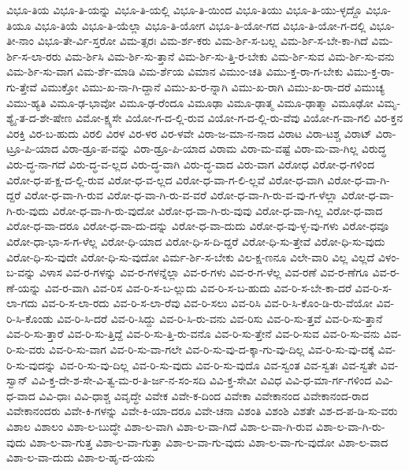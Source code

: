 {ವಿಭೂ-ತಿಯ
ವಿಭೂ-ತಿ-ಯನ್ನು
ವಿಭೂ-ತಿ-ಯಲ್ಲಿ
ವಿಭೂ-ತಿ-ಯಿಂದ
ವಿಭೂ-ತಿಯು
ವಿಭೂ-ತಿ-ಯು-ಳ್ಳದ್ದೊ
ವಿಭೂ-ತಿಯೂ
ವಿಭೂ-ತಿಯೆ
ವಿಭೂ-ತಿ-ಯೆಲ್ಲಾ
ವಿಭೂ-ತಿ-ಯೋಗ
ವಿಭೂ-ತಿ-ಯೋ-ಗದ
ವಿಭೂ-ತಿ-ಯೋ-ಗ-ದಲ್ಲಿ
ವಿಭೂ-ತೀ-ನಾಂ
ವಿಭೂ-ತೇ-ರ್ವಿ-ಸ್ತರೋ
ವಿಮ-ತ್ಸರಃ
ವಿಮ-ರ್ಶ-ಕರು
ವಿಮ-ರ್ಶಿ-ಸ-ಬಲ್ಲ
ವಿಮ-ರ್ಶಿ-ಸ-ಬೇ-ಕಾ-ಗಿದೆ
ವಿಮ-ರ್ಶಿ-ಸ-ಲಾ-ರರು
ವಿಮ-ರ್ಶಿಸಿ
ವಿಮ-ರ್ಶಿ-ಸು-ತ್ತಾನೆ
ವಿಮ-ರ್ಶಿ-ಸು-ತ್ತಿ-ರ-ಬೇಕು
ವಿಮ-ರ್ಶಿ-ಸುವ
ವಿಮ-ರ್ಶಿ-ಸು-ವನು
ವಿಮ-ರ್ಶಿ-ಸು-ವಾಗ
ವಿಮ-ರ್ಶೆ-ಮಾಡಿ
ವಿಮ-ರ್ಶೆಯ
ವಿಮಾನ
ವಿಮುಂ-ಚತಿ
ವಿಮು-ಕ್ತ-ರಾ-ಗ-ಬೇಕು
ವಿಮು-ಕ್ತ-ರಾ-ಗು-ತ್ತೇವೆ
ವಿಮುಕ್ತೋ
ವಿಮು-ಖ-ನಾ-ಗಿ-ದ್ದಾನೆ
ವಿಮು-ಖ-ರ-ನ್ನಾಗಿ
ವಿಮು-ಖ-ರಾಗಿ
ವಿಮು-ಖ-ರಾ-ದರೆ
ವಿಮುಚ್ಯ
ವಿಮು-ಹ್ಯತಿ
ವಿಮೂ-ಢ-ಭಾವೋ
ವಿಮೂ-ಢ-ರೆಂದೂ
ವಿಮೂಢಾ
ವಿಮೂ-ಢಾತ್ಮ
ವಿಮೂ-ಢಾತ್ಮಾ
ವಿಮೂಢೋ
ವಿಮೃ-ಶ್ಯೈ-ತ-ದ-ಶೇ-ಷೇಣ
ವಿಮೋ-ಕ್ಷ್ಯಸೇ
ವಿಯೋ-ಗ-ದ-ಲ್ಲಿ-ರುವ
ವಿಯೋ-ಗ-ದ-ಲ್ಲಿ-ರು-ವೆವು
ವಿಯೋ-ಗ-ವಾ-ಗಲಿ
ವಿರ-ಕ್ತನ
ವಿರಕ್ತಿ
ವಿರ-ಬ-ಹುದು
ವಿರಲಿ
ವಿರಳ
ವಿರ-ಳರ
ವಿರ-ಳವೇ
ವಿರಾ-ಜ-ಮಾ-ನ-ನಾದ
ವಿರಾಟ
ವಿರಾ-ಟಶ್ಚ
ವಿರಾಟ್
ವಿರಾ-ಟ್ರೂ-ಪಿ-ಯಾದ
ವಿರಾ-ಡ್ರೂ-ಪ-ವನ್ನು
ವಿರಾ-ಡ್ರೂ-ಪಿ-ಯಾದ
ವಿರಾಮ
ವಿರಾ-ಮ-ವಷ್ಟೆ
ವಿರಾ-ಮ-ವಾ-ಗಿಲ್ಲ
ವಿರುದ್ಧ
ವಿರು-ದ್ಧ-ನಾ-ಗದೆ
ವಿರು-ದ್ಧ-ವ-ಲ್ಲದ
ವಿರು-ದ್ಧ-ವಾಗಿ
ವಿರು-ದ್ಧ-ವಾದ
ವಿರು-ವಾಗ
ವಿರೋಧ
ವಿರೋ-ಧ-ಗಳಿಂದ
ವಿರೋ-ಧ-ಪ-ಕ್ಷ-ದ-ಲ್ಲಿ-ರುವ
ವಿರೋ-ಧ-ವ-ಲ್ಲದ
ವಿರೋ-ಧ-ವಾ-ಗ-ಲಿ-ಲ್ಲವೆ
ವಿರೋ-ಧ-ವಾಗಿ
ವಿರೋ-ಧ-ವಾ-ಗಿ-ದ್ದರೆ
ವಿರೋ-ಧ-ವಾ-ಗಿ-ರುವ
ವಿರೋ-ಧ-ವಾ-ಗಿ-ರು-ವ-ವರೆ
ವಿರೋ-ಧ-ವಾ-ಗಿ-ರು-ವ-ವು-ಗ-ಳೆಲ್ಲಾ
ವಿರೋ-ಧ-ವಾ-ಗಿ-ರು-ವುದು
ವಿರೋ-ಧ-ವಾ-ಗಿ-ರು-ವುದೋ
ವಿರೋ-ಧ-ವಾ-ಗಿ-ರು-ವುವು
ವಿರೋ-ಧ-ವಾ-ಗಿಲ್ಲ
ವಿರೋ-ಧ-ವಾದ
ವಿರೋ-ಧ-ವಾ-ದರೂ
ವಿರೋ-ಧ-ವಾ-ದು-ದನ್ನು
ವಿರೋ-ಧ-ವಾ-ದುದು
ವಿರೋ-ಧ-ವು-ಳ್ಳ-ವು-ಗಳು
ವಿರೋ-ಧವೂ
ವಿರೋ-ಧಾ-ಭಾ-ಸ-ಗ-ಳೆಲ್ಲ
ವಿರೋ-ಧಿ-ಯಾದ
ವಿರೋ-ಧಿ-ಸ-ದಿ-ದ್ದರೆ
ವಿರೋ-ಧಿ-ಸು-ತ್ತೇವೆ
ವಿರೋ-ಧಿ-ಸು-ವುದು
ವಿರೋ-ಧಿ-ಸು-ವುದೇ
ವಿರೋ-ಧಿ-ಸು-ವುದೋ
ವಿರ್ಮ-ರ್ಶಿ-ಸ-ಬೇಕು
ವಿಲ-ಕ್ಷ-ಣನೂ
ವಿಲೇ-ವಾರಿ
ವಿಲ್ಲ
ವಿಲ್ಲದೆ
ವಿಳಂ-ಬ-ವನ್ನು
ವಿಳಾಸ
ವಿವ-ರ-ಗಳನ್ನು
ವಿವ-ರ-ಗಳನ್ನೆಲ್ಲಾ
ವಿವ-ರ-ಗಳು
ವಿವ-ರ-ಗ-ಳೆಲ್ಲ
ವಿವ-ರಣೆ
ವಿವ-ರ-ಣೆಗೂ
ವಿವ-ರ-ಣೆ-ಯನ್ನು
ವಿವ-ರ-ವಾಗಿ
ವಿವ-ರಿಸ
ವಿವ-ರಿ-ಸ-ಬ-ಲ್ಲುದು
ವಿವ-ರಿ-ಸ-ಬ-ಹುದು
ವಿವ-ರಿ-ಸ-ಬೇ-ಕಾ-ದರೆ
ವಿವ-ರಿ-ಸ-ಲಾ-ಗದು
ವಿವ-ರಿ-ಸ-ಲಾ-ರದು
ವಿವ-ರಿ-ಸ-ಲಾ-ರೆವು
ವಿವ-ರಿ-ಸಲು
ವಿವ-ರಿಸಿ
ವಿವ-ರಿ-ಸಿ-ಕೊಂ-ಡಿ-ರು-ವೆಯೋ
ವಿವ-ರಿ-ಸಿ-ಕೊಂಡು
ವಿವ-ರಿ-ಸಿ-ದರೆ
ವಿವ-ರಿ-ಸಿದ್ದು
ವಿವ-ರಿ-ಸಿ-ರು-ವನು
ವಿವ-ರಿಸು
ವಿವ-ರಿ-ಸು-ತ್ತವೆ
ವಿವ-ರಿ-ಸು-ತ್ತಾನೆ
ವಿವ-ರಿ-ಸು-ತ್ತಾರೆ
ವಿವ-ರಿ-ಸು-ತ್ತಿದ್ದೆ
ವಿವ-ರಿ-ಸು-ತ್ತಿ-ರು-ವನೊ
ವಿವ-ರಿ-ಸು-ತ್ತೇನೆ
ವಿವ-ರಿ-ಸುವ
ವಿವ-ರಿ-ಸು-ವನು
ವಿವ-ರಿ-ಸು-ವರು
ವಿವ-ರಿ-ಸು-ವಾಗ
ವಿವ-ರಿ-ಸು-ವಾ-ಗಲೇ
ವಿವ-ರಿ-ಸು-ವು-ದ-ಕ್ಕಾ-ಗು-ವು-ದಿಲ್ಲ
ವಿವ-ರಿ-ಸು-ವು-ದಕ್ಕೆ
ವಿವ-ರಿ-ಸು-ವುದನ್ನು
ವಿವ-ರಿ-ಸು-ವು-ದಿಲ್ಲ
ವಿವ-ರಿ-ಸು-ವುದು
ವಿವ-ರಿ-ಸು-ವುದೊ
ವಿವ-ಸ್ವಂತ
ವಿವ-ಸ್ವತಃ
ವಿವ-ಸ್ವತೇ
ವಿವ-ಸ್ವಾನ್
ವಿವಿ-ಕ್ತ-ದೇ-ಶ-ಸೇ-ವಿ-ತ್ವ-ಮ-ರ-ತಿ-ರ್ಜ-ನ-ಸಂ-ಸದಿ
ವಿವಿ-ಕ್ತ-ಸೇವೀ
ವಿವಿಧ
ವಿವಿ-ಧ-ಮಾ-ರ್ಗ-ಗಳಿಂದ
ವಿವಿ-ಧ-ವಾದ
ವಿವಿ-ಧಾಃ
ವಿವಿ-ಧಾಶ್ಚ
ವಿವೃದ್ಧೇ
ವಿವೇಕ
ವಿವೇ-ಕ-ದಿಂದ
ವಿವೇಕಾ
ವಿವೇಕಾನಂದ
ವಿವೇಕಾನಂದ-ರಾದ
ವಿವೇಕಾನಂದರು
ವಿವೇ-ಕಿ-ಗಳನ್ನು
ವಿವೇ-ಕಿ-ಯಾ-ದರೂ
ವಿವೇ-ಚನಾ
ವಿಶಂತಿ
ವಿಶಂಶಿ
ವಿಶತೇ
ವಿಶ-ದ-ಪ-ಡಿ-ಸು-ವರು
ವಿಶಾಲ
ವಿಶಾಲಂ
ವಿಶಾ-ಲ-ಬುದ್ಧೇ
ವಿಶಾ-ಲ-ವಾಗಿ
ವಿಶಾ-ಲ-ವಾ-ಗಿದೆ
ವಿಶಾ-ಲ-ವಾ-ಗಿ-ರುವ
ವಿಶಾ-ಲ-ವಾ-ಗಿ-ರು-ವುದು
ವಿಶಾ-ಲ-ವಾ-ಗುತ್ತ
ವಿಶಾ-ಲ-ವಾ-ಗುತ್ತಾ
ವಿಶಾ-ಲ-ವಾ-ಗು-ವುದು
ವಿಶಾ-ಲ-ವಾ-ಗು-ವುದೋ
ವಿಶಾ-ಲ-ವಾದ
ವಿಶಾ-ಲ-ವಾ-ದುದು
ವಿಶಾ-ಲ-ಹೃ-ದ-ಯನು
}
